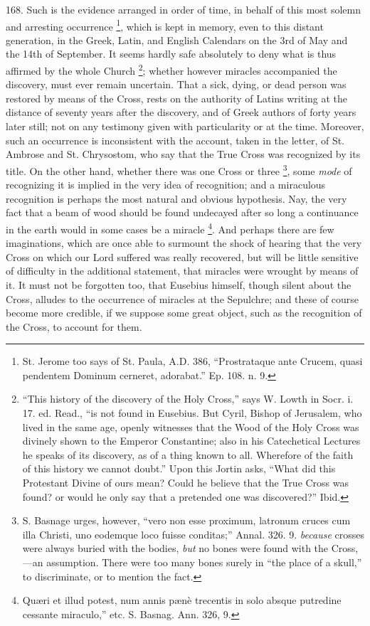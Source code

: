 168.
Such is the evidence arranged in order of time, in behalf of this most
solemn and arresting occurrence \footnote{St. Jerome too says of St. Paula, A.D. 386, ``Prostrataque
ante Crucem, quasi pendentem Dominum cerneret, adorabat.'' Ep. 108. n.
9.}, which is kept in memory, even to this distant generation, in
the Greek, Latin, and English Calendars on the 3rd of May and the 14th
of September. It seems hardly safe absolutely to deny what is thus
affirmed by the whole Church \footnote{``This history of the discovery of the Holy Cross,'' says W. Lowth
in Socr. i. 17. ed. Read., ``is not found in Eusebius. But Cyril,
Bishop of Jerusalem, who lived in the same age, openly witnesses that
the Wood of the Holy Cross was divinely shown to the Emperor
Constantine; also in his Catechetical Lectures he speaks of its
discovery, as of a thing known to all. Wherefore of the faith of this
history we cannot doubt.'' Upon this Jortin asks, ``What did this
Protestant Divine of ours mean? Could he believe that the True Cross
was found? or would he only say that a pretended one was discovered?''
Ibid.}; whether however miracles accompanied the discovery,
must ever remain uncertain. That a sick, dying, or dead person was
restored by means of the Cross, rests on the authority of Latins
writing at the distance of seventy years after the discovery, and of
Greek authors of forty years later still; not on any testimony given
with particularity or at the time. Moreover, such an occurrence is
inconsistent with the account, taken in the letter, of St. Ambrose and
St. Chrysostom, who say that the True Cross was recognized by its
title. On the other hand, whether there was one Cross or three \footnote{S. Basnage urges, however, ``vero non esse proximum, latronum cruces
cum illa Christi, uno eodemque loco fuisse conditas;'' Annal. 326. 9. \emph{because}
crosses were always buried with the bodies, \emph{but} no bones were
found with the Cross,—an assumption. There were too many bones
surely in ``the place of a skull,'' to discriminate, or to mention the
fact.}, some \emph{mode} of recognizing it is implied in the very
idea of recognition; and a miraculous recognition is perhaps the most
natural and obvious hypothesis. Nay, the very fact that a beam of wood
should be found undecayed after so long a continuance in the earth
would in some cases be a miracle \footnote{Quæri et illud potest, num annis pænè trecentis in solo absque
putredine cessante miraculo,'' etc. S. Basnag. Ann. 326, 9.}. And perhaps there are few imaginations, which are once
able to surmount the shock of hearing that the very Cross on which our
Lord suffered was really recovered, but will be little sensitive of
difficulty in the additional statement, that miracles were wrought by
means of it. It must not be forgotten too, that Eusebius himself,
though silent about the Cross, alludes to the occurrence of miracles
at the Sepulchre; and these of course become more credible, if we
suppose some great object, such as the recognition of the Cross, to
account for them.

